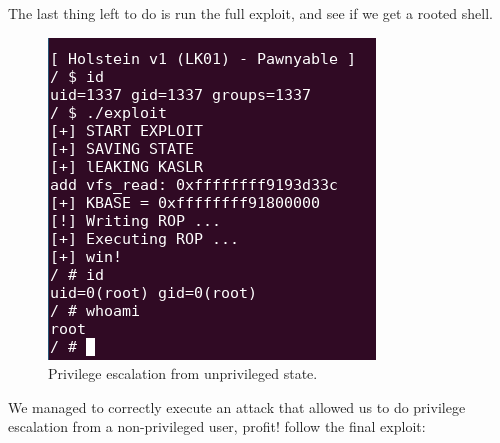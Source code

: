     The last thing left to do is run the full exploit, and see if we get a rooted shell.\newline
    \begin{figure}[htbp]
        \centering
        \includegraphics[width=0.8\linewidth]{Images/LPE_kernel_exploit.png}
        \caption{Privilege escalation from unprivileged state.}
        \label{fig:enter-label}
    \end{figure}
    We managed to correctly execute an attack that allowed us to do privilege escalation from a non-privileged user, profit!\newline
    follow the final exploit: \newline
    
    
    
    
    
